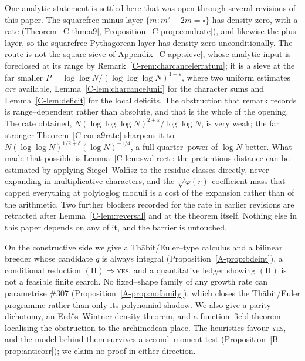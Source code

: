 \documentclass[11pt]{article}
\theoremstyle{definition}
\begin{document}
One analytic statement is settled here that was open through several revisions of this paper. The
squarefree minus layer $\{m:m'-2m=\square\}$ has density zero, with a rate
(Theorem~\ref{C-thm:a9}, Proposition~\ref{C-prop:condrate}), and likewise the plus layer, so the
squarefree Pythagorean layer has density zero unconditionally. The route is not the square sieve of
Appendix~\ref{C-app:sieve}, whose analytic input is foreclosed at its range by
Remark~\ref{C-rem:charcancelerratum}; it is a sieve at the far smaller
$P=\log\log N/(\log\log\log N)^{1+\varepsilon}$, where two uniform estimates \emph{are} available, Lemma~\ref{C-lem:charcancelunif} for the character sums and Lemma~\ref{C-lem:deficit} for the local
deficits. The obstruction that remark records is range--dependent rather than
absolute, and that is the whole of the opening. The rate obtained,
$N(\log\log\log N)^{2+\varepsilon}/\log\log N$, is very weak; the far stronger
Theorem~\ref{C-cor:a9rate} sharpens it to
$N(\log\log N)^{1/2+\delta}(\log N)^{-1/4}$, a full quarter--power of $\log N$ better. What made that
possible is Lemma~\ref{C-lem:swdirect}: the pretentious distance can be estimated by applying
Siegel--Walfisz to the residue classes directly, never expanding in multiplicative characters, and
the $\sqrt{\varphi(r)}$ coefficient mass that capped everything at polyloglog moduli is a cost of the
expansion rather than of the arithmetic. Two further blockers recorded for the rate in earlier
revisions are retracted after Lemma~\ref{C-lem:reversal} and at the theorem itself. Nothing else in this paper
depends on any of it, and the barrier is untouched.

On the constructive side we give a Th\=abit/Euler--type calculus and a bilinear breeder whose
candidate $q$ is always integral (Proposition~\ref{A-prop:bdeint}), a conditional reduction
$(\mathrm{H})\Rightarrow$\textsc{yes}, and a quantitative ledger showing $(\mathrm{H})$ is not a
feasible finite search. No fixed--shape family of any growth rate can parametrise \#307
(Proposition~\ref{A-prop:nofamily}), which closes the Th\=abit/Euler programme rather than only its
polynomial shadow. We also give a parity dichotomy, an Erd\H{o}s--Wintner density theorem, and a
function--field theorem localising the obstruction to the archimedean place. The heuristics favour
\textsc{yes}, and the model behind them survives a second--moment test
(Proposition~\ref{B-prop:anticorr}); we claim no proof in either direction.
\end{document}
